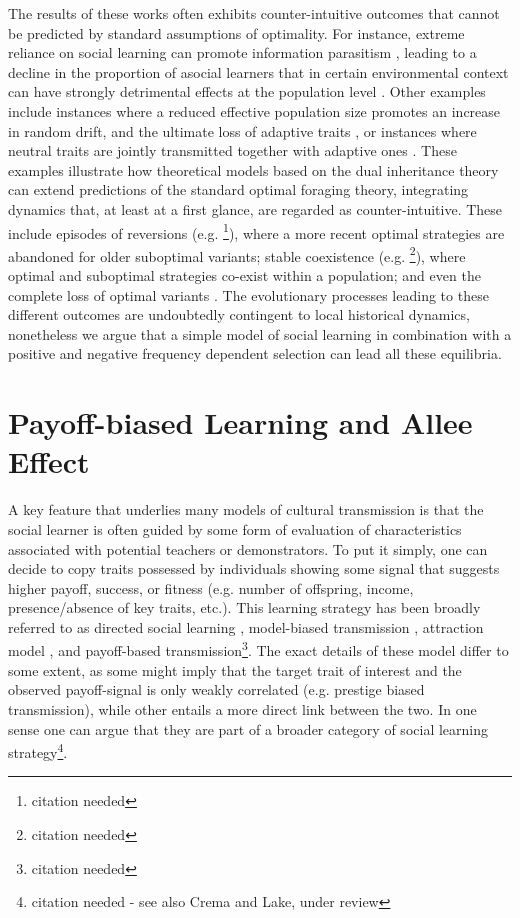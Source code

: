 \documentclass[preprint,authoryear]{elsarticle}
\begin{document}
The results of these works often exhibits counter-intuitive outcomes that cannot be predicted by standard assumptions of optimality. For instance, extreme reliance on social learning can promote information parasitism \citep{giraldeau2002}, leading to a decline in the proportion of asocial learners that in certain environmental context can have strongly detrimental effects at the population level \citep{whitehead2009}. Other examples include instances where a reduced effective population size promotes an increase in random drift, and the ultimate loss of adaptive traits \citep{henrich2004}, or instances where neutral traits are jointly transmitted together with adaptive ones \citep{ackland2007}. These examples illustrate how theoretical models based on the dual inheritance theory can extend predictions of the standard optimal foraging theory, integrating dynamics that, at least at a first glance, are regarded as counter-intuitive. These include episodes of reversions (e.g. \footnote{citation needed}), where a more recent optimal strategies are abandoned for older suboptimal variants; stable coexistence (e.g. \footnote{citation needed}), where optimal and suboptimal strategies co-exist within a population; and even the complete loss of optimal variants \citep[e.g.][]{henrich2004}. The evolutionary processes leading to these different outcomes are undoubtedly contingent to local historical dynamics, nonetheless we argue that a simple model of social learning in combination with a positive and negative frequency dependent selection can lead all these equilibria.

\section{Payoff-biased Learning and Allee Effect}

A key feature that underlies many models of cultural transmission is that the social learner is often guided by some form of evaluation of characteristics associated with potential teachers or demonstrators. To put it simply, one can decide to copy traits possessed by individuals showing some signal that suggests higher payoff, success, or fitness (e.g. number of offspring, income, presence/absence of key traits, etc.). This learning strategy has been broadly referred to as directed social learning \citep{coussi1995}, model-biased transmission \citep{boyd1985,henrich2001}, attraction model \citep{acerbi2014}, and payoff-based transmission\footnote{citation needed}. The exact details of these model differ to some extent, as some might imply that the target trait of interest and the observed payoff-signal is only weakly correlated (e.g. prestige biased transmission), while other entails a more direct link between the two. In one sense one can argue that they are part of a broader category of social learning strategy\footnote{citation needed - see also Crema and Lake, under review}.
\end{document}
